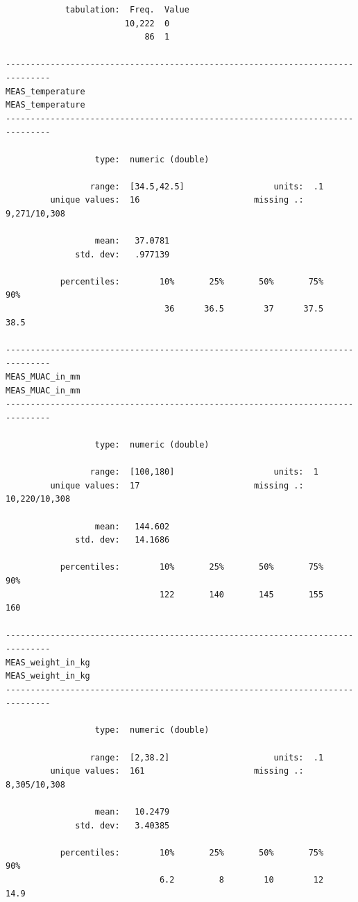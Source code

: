 \documentclass[
  letterpaper,
  DIV=11,
  numbers=noendperiod]{scrreprt}
\begin{document}
\begin{verbatim}
            tabulation:  Freq.  Value
                        10,222  0
                            86  1

-------------------------------------------------------------------------------
MEAS_temperature                                               MEAS_temperature
-------------------------------------------------------------------------------

                  type:  numeric (double)

                 range:  [34.5,42.5]                  units:  .1
         unique values:  16                       missing .:  9,271/10,308

                  mean:   37.0781
              std. dev:   .977139

           percentiles:        10%       25%       50%       75%       90%
                                36      36.5        37      37.5      38.5

-------------------------------------------------------------------------------
MEAS_MUAC_in_mm                                                 MEAS_MUAC_in_mm
-------------------------------------------------------------------------------

                  type:  numeric (double)

                 range:  [100,180]                    units:  1
         unique values:  17                       missing .:  10,220/10,308

                  mean:   144.602
              std. dev:   14.1686

           percentiles:        10%       25%       50%       75%       90%
                               122       140       145       155       160

-------------------------------------------------------------------------------
MEAS_weight_in_kg                                             MEAS_weight_in_kg
-------------------------------------------------------------------------------

                  type:  numeric (double)

                 range:  [2,38.2]                     units:  .1
         unique values:  161                      missing .:  8,305/10,308

                  mean:   10.2479
              std. dev:   3.40385

           percentiles:        10%       25%       50%       75%       90%
                               6.2         8        10        12      14.9


\end{verbatim}
\end{document}
